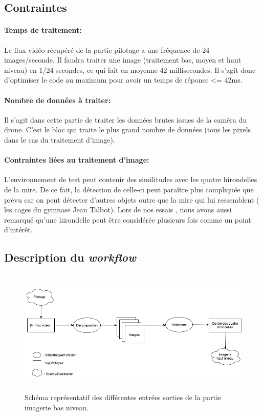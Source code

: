 \documentclass[12pt]{article}
\begin{document}
\subsection{Contraintes}
\paragraph*{Temps de traitement:}
Le flux vidéo récupéré de la partie pilotage a une fréquence de 24 images/seconde. Il faudra traiter une image (traitement bas, moyen et haut niveau) en 1/24 secondes, ce qui fait en moyenne 42 millisecondes. Il s'agit donc d'optimiser le code au maximum pour avoir un temps de réponse <= 42ms.
\paragraph*{Nombre de données à traiter:}
Il s’agit dans cette partie de traiter les
données brutes issues de la caméra du drone. C’est le bloc qui traite le plus grand nombre de données (tous les pixels dans le cas du traitement
d’image).
\paragraph*{Contraintes liées au traitement d'image:}
L'environnement de test peut contenir des similitudes avec les quatre hirondelles de la mire. De ce fait, la détection de celle-ci peut paraître plus compliquée que prévu car on peut détecter d'autres objets outre que la mire qui lui ressemblent ( les cages du gymnase Jean Talbot).
Lors de nos essais , nous avons aussi remarqué qu'une hirondelle peut être considérée plusieurs fois comme un point d'intérêt.




\subsection{Description du  \textit{workflow}}
\label{section:Workflow}
 \begin{figure}[H]
\centering
\includegraphics[height=6cm]{workflowG.png}
\caption{Schéma représentatif des différentes entrées sorties de la partie imagerie bas niveau. }
\label{fig:WorkflowG}
\end{figure}
\end{document}

